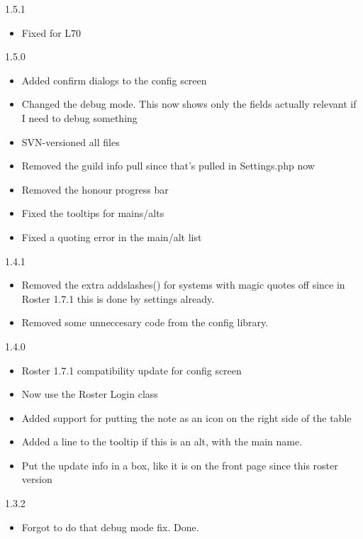 \documentclass[12pt, a4paper]{article}
\begin{document}
\begin{description}
\item{1.5.1}
\begin{itemize}
\item Fixed for L70
\end{itemize}

\item{1.5.0}
\begin{itemize}
\item Added confirm dialogs to the config screen
\item Changed the debug mode. This now shows only the fields actually relevant if
   I need to debug something
\item SVN-versioned all files
\item Removed the guild info pull since that's pulled in Settings.php now
\item Removed the honour progress bar
\item Fixed the tooltips for mains/alts
\item Fixed a quoting error in the main/alt list
\end{itemize}

\item{1.4.1}
\begin{itemize}
\item Removed the extra addslashes() for systems with magic quotes off since in
   Roster 1.7.1 this is done by settings already.
\item Removed some unneccesary code from the config library.
\end{itemize}

\item{1.4.0}
\begin{itemize}
\item Roster 1.7.1 compatibility update for config screen
\item Now use the Roster Login class
\item Added support for putting the note as an icon on the right side of the table
\item Added a line to the tooltip if this is an alt, with the main name.
\item Put the update info in a box, like it is on the front page since this roster
   version
\end{itemize}

\item{1.3.2}
\begin{itemize}
\item Forgot to do that debug mode fix. Done.
\end{itemize}


\end{description}
\end{document}
